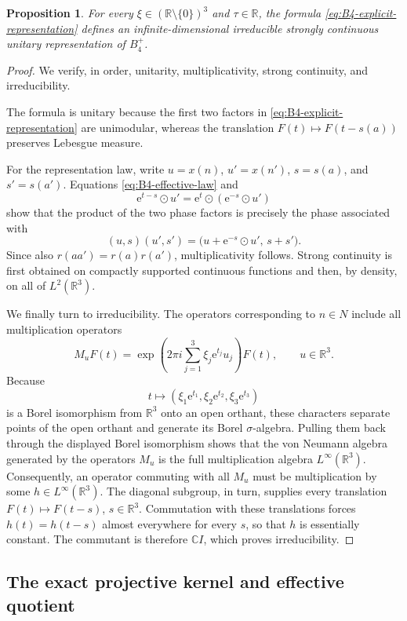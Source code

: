 \documentclass[10pt,a4paper]{amsart}
\numberwithin{equation}{section}
\newtheorem{proposition}[theorem]{Proposition}
\newcommand{\R}{\mathbb R}
\newcommand{\e}{\mathrm e}
\begin{document}
\begin{proposition}
\label{prop:B4-explicit-representation}
For every $\xi\in(\R\setminus\{0\})^3$ and $\tau\in\R$, the formula
\eqref{eq:B4-explicit-representation} defines an infinite-dimensional
irreducible strongly continuous unitary representation of $B_4^+$.
\end{proposition}

\begin{proof}
We verify, in order, unitarity, multiplicativity, strong continuity, and
irreducibility.

The formula is unitary because the first two factors in
\eqref{eq:B4-explicit-representation} are unimodular, whereas the translation
$F(t)\mapsto F(t-s(a))$ preserves Lebesgue measure.

For the representation law, write $u=x(n)$, $u'=x(n')$,
$s=s(a)$, and $s'=s(a')$.  Equations
\eqref{eq:B4-effective-law} and
\[
 \e^{t-s}\odot u'=\e^t\odot(\e^{-s}\odot u')
\]
show that the product of the two phase factors is precisely the phase
associated with
\[
 (u,s)(u',s')
 =\bigl(u+\e^{-s}\odot u',\,s+s'\bigr).
\]
Since also $r(aa')=r(a)r(a')$, multiplicativity follows.  Strong continuity
is first obtained on compactly supported continuous functions and then, by
density, on all of $L^2(\R^3)$.

We finally turn to irreducibility.  The operators corresponding to $n\in N$
include all multiplication operators
\[
 M_uF(t)=
 \exp\left(2\pi i\sum_{j=1}^3\xi_j\e^{t_j}u_j\right)F(t),
 \qquad u\in\R^3.
\]
Because
\[
 t\longmapsto(\xi_1\e^{t_1},\xi_2\e^{t_2},\xi_3\e^{t_3})
\]
is a Borel isomorphism from $\R^3$ onto an open orthant, these characters
separate points of the open orthant and generate its Borel $\sigma$-algebra.
Pulling them back through the displayed Borel isomorphism shows that the von
Neumann algebra generated by the operators $M_u$ is the full multiplication
algebra $L^\infty(\R^3)$.  Consequently, an operator commuting with all
$M_u$ must be multiplication by some
$h\in L^\infty(\R^3)$.  The diagonal subgroup, in turn, supplies every
translation $F(t)\mapsto F(t-s)$, $s\in\R^3$.  Commutation with these
translations forces $h(t)=h(t-s)$ almost everywhere for every $s$, so that
$h$ is essentially constant.  The commutant is therefore $\mathbb CI$,
which proves irreducibility.
\end{proof}

\subsection{The exact projective kernel and effective quotient}
\end{document}
